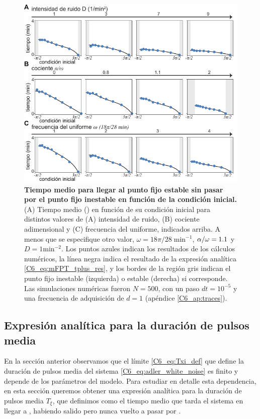 \documentclass[./main.tex]{subfiles}
\begin{document}
\begin{figure}
    \centering
    \includegraphics[width=1\columnwidth]{figures/chapter6/C6_t_plus.pdf} 
    \caption{\textbf{Tiempo medio para llegar al punto fijo estable sin pasar por el punto fijo inestable en función de la condición inicial.} (A) Tiempo medio \tplus(\xx) en función de su condición inicial \xx para distintos valores de (A) intensidad de ruido, (B) cociente adimensional \dddelta y (C) frecuencia del uniforme, indicados arriba. A menos que se especifique otro valor, $\omega = 18\pi/28 \; \text{min}^{-1}$, $\alpha/\omega = 1.1$ y $D=1 \text{min}^{-2}$. Los puntos azules indican los resultados de los cálculos numéricos, la línea negra indica el resultado de la expresión analítica \ref{C6_eq:mFPT_tplus_res}, y los bordes de la región gris indican el punto fijo inestable (izquierda) o estable (derecha) si corresponde. Las simulaciones numéricas fueron $N=500$, con un paso $dt = 10^{-5}$ y una frecuencia de adquisición de $d=1$ (apéndice \ref{C6_ap:traces}).}
    \label{C6_fig:mFPT_tplus}
\end{figure}

\subsection{Expresión analítica para la duración de pulsos media}

En la sección anterior observamos que el límite \ref{C6_eq:Txi_def} que define la duración de pulsos media del sistema \ref{C6_eq:adler_white_noise} es finito y depende de los parámetros del modelo. Para estudiar en detalle esta dependencia, en esta sección queremos obtener una expresión analítica para la duración de pulsos media $T_\xi$, que definimos como el tiempo medio que tarda el sistema en llegar a \xxe, habiendo salido pero nunca vuelto a pasar por \xxi.
\end{document}
